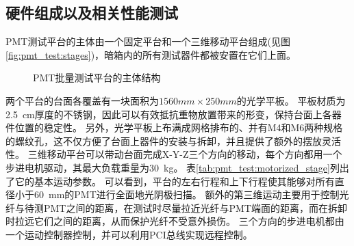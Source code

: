 \subsection{硬件组成以及相关性能测试}
\label{sec:pmt_test:testbench_hardware}
PMT测试平台的主体由一个固定平台和一个三维移动平台组成(见图\ref{fig:pmt_test:stages})，暗箱内的所有测试器件都被安置在它们上面。
\begin{figure}[htbp]
	\centering
	\caption{PMT批量测试平台的主体结构}
	\label{fig:blindfigure}
\end{figure}
两个平台的台面各覆盖有一块面积为$1560mm\times250mm$的光学平板。
平板材质为\SI{2.5}{cm}厚度的不锈钢，因此可以有效抵抗重物放置带来的形变，保持台面上各器件位置的稳定性。
另外，光学平板上布满成网格排布的、并有M4和M6两种规格的螺纹孔，这不仅方便了台面上器件的安装与拆卸，并且提供了额外的摆放灵活性。
三维移动平台可以带动台面完成X-Y-Z三个方向的移动，每个方向都用一个步进电机驱动，其最大负载重量为\SI{30}{\kilo\gram}。
表\ref{tab:pmt_test:motorized_stage}列出了它的基本运动参数。
可以看到，平台的左右行程和上下行程使其能够对所有直径小于\SI{60}{\milli\meter}的PMT进行全面地光阴极扫描。
额外的第三维运动主要用于控制光纤与待测PMT之间的距离，在测试时尽量拉近光纤与PMT端面的距离，而在拆卸时拉远它们之间的距离，从而保护光纤不受意外损伤。
三个方向的步进电机都由一个运动控制器控制\cite{leetro}，并可以利用PCI总线实现远程控制。

